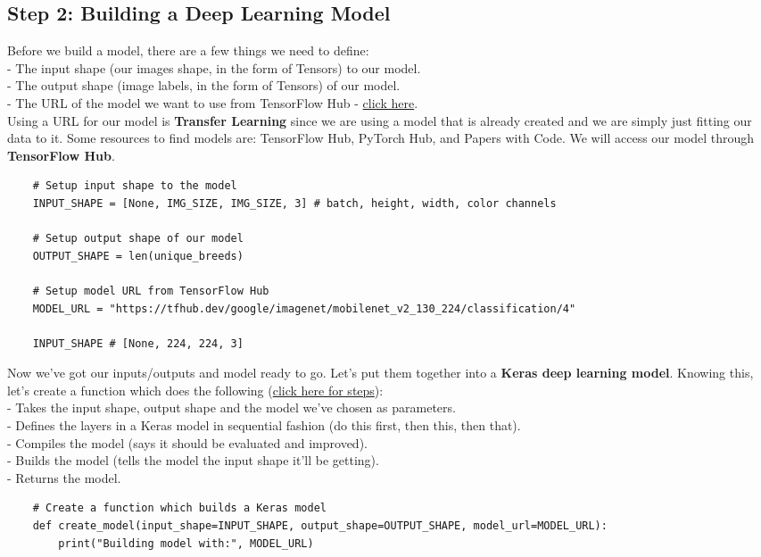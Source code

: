 \documentclass[11pt, a4paper]{article}
\begin{document}
\begin{spacing}{1.1}
	\subsection{Step 2: Building a Deep Learning Model}
	Before we build a model, there are a few things we need to define: \\
	\hspace*{2mm} - The input shape (our images shape, in the form of Tensors) to our model. \\
	\hspace*{2mm} - The output shape (image labels, in the form of Tensors) of our model. \\
	\hspace*{2mm} - The URL of the model we want to use from TensorFlow Hub -  \href{https://tfhub.dev/google/imagenet/mobilenet_v2_130_224/classification/4}{click here}. \vspace*{1mm} \\
	Using a URL for our model is \textbf{Transfer Learning} since we are using a model that is already created and we are simply just fitting our data to it. Some resources to find models are: TensorFlow Hub, PyTorch Hub, and Papers with Code. We will access our model through \textbf{TensorFlow Hub}.
	\begin{lstlisting}
	# Setup input shape to the model
	INPUT_SHAPE = [None, IMG_SIZE, IMG_SIZE, 3] # batch, height, width, color channels
	
	# Setup output shape of our model
	OUTPUT_SHAPE = len(unique_breeds)
	
	# Setup model URL from TensorFlow Hub
	MODEL_URL = "https://tfhub.dev/google/imagenet/mobilenet_v2_130_224/classification/4"
	
	INPUT_SHAPE # [None, 224, 224, 3] \end{lstlisting} \vspace*{1mm}
	Now we've got our inputs/outputs and model ready to go. Let's put them together into a \textbf{Keras deep learning model}. Knowing this, let's create a function which does the following (\href{https://www.tensorflow.org/guide/keras/overview}{click here for steps}): \\
	\hspace*{2mm} - Takes the input shape, output shape and the model we've chosen as parameters. \\
	\hspace*{2mm} - Defines the layers in a Keras model in sequential fashion (do this first, then this, then that). \\
	\hspace*{2mm} - Compiles the model (says it should be evaluated and improved). \\
	\hspace*{2mm} - Builds the model (tells the model the input shape it'll be getting). \\
	\hspace*{2mm} - Returns the model.
	\begin{lstlisting}
	# Create a function which builds a Keras model
	def create_model(input_shape=INPUT_SHAPE, output_shape=OUTPUT_SHAPE, model_url=MODEL_URL):
		print("Building model with:", MODEL_URL)
		

\end{lstlisting}
\end{spacing}
\end{document}
